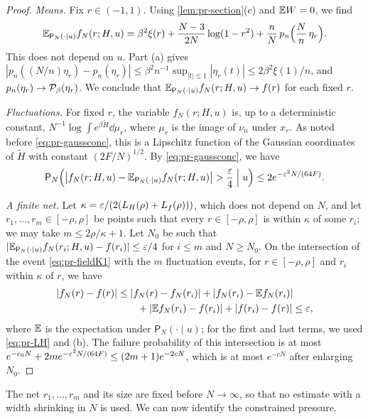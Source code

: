 \begin{proof}
\emph{Means.} Fix $r\in(-1,1)$. Using \cref{lem:pr-section}(c) and $\mathbb E W=0$, we find
\[
\mathbb E_{\mathsf P_N(\cdot\mid u)}f_N(r;H,u)=\beta^2\xi(r)+\frac{N-3}{2N}\log(1-r^2)+\frac nN\,p_n\Bigl(\frac Nn\,\eta_r\Bigr).
\]
This does not depend on $u$. Part (a) gives $|p_n((N/n)\eta_r)-p_n(\eta_r)|\le\beta^2n^{-1}\sup_{|t|\le1}|\eta_r(t)|\le 2\beta^2\xi(1)/n$, and $p_n(\eta_r)\to\mathcal P_\beta(\eta_r)$. We conclude that $\mathbb E_{\mathsf P_N(\cdot\mid u)}f_N(r;H,u)\to f(r)$ for each fixed $r$.

\emph{Fluctuations.} For fixed $r$, the variable $f_N(r;H,u)$ is, up to a deterministic constant, $N^{-1}\log\int e^{\beta\widetilde H}\dd\mu_r$, where $\mu_r$ is the image of $\nu_n$ under $x_r$. As noted before \eqref{eq:pr-gaussconc}, this is a Lipschitz function of the Gaussian coordinates of $\widetilde H$ with constant $(2F/N)^{1/2}$. By \eqref{eq:pr-gaussconc}, we have
\[
\mathsf P_N\Bigl(\bigl|f_N(r;H,u)-\E_{\mathsf P_N(\cdot\mid u)}f_N(r;H,u)\bigr|>\frac\eps4\Bigm| u\Bigr)\le 2e^{-\eps^2N/(64F)} .
\]

\emph{A finite net.} Let $\kappa=\varepsilon/(2(L_H(\rho)+L_f(\rho)))$, which does not depend on $N$, and let $r_1,\dots,r_m\in[-\rho,\rho]$ be points such that every $r\in[-\rho,\rho]$ is within $\kappa$ of some $r_i$; we may take $m\le 2\rho/\kappa+1$. Let $N_0$ be such that $|\mathbb E_{\mathsf P_N(\cdot\mid u)}f_N(r_i;H,u)-f(r_i)|\le\varepsilon/4$ for $i\le m$ and $N\ge N_0$. On the intersection of the event \eqref{eq:pr-fieldK1} with the $m$ fluctuation events, for $r\in[-\rho,\rho]$ and $r_i$ within $\kappa$ of $r$, we have
\begin{align*}
|f_N(r)-f(r)|&\le|f_N(r)-f_N(r_i)|+|f_N(r_i)-\mathbb E f_N(r_i)|\\
&\qquad+|\mathbb E f_N(r_i)-f(r_i)|+|f(r_i)-f(r)|\le\varepsilon,
\end{align*}
where $\mathbb E$ is the expectation under $\mathsf P_N(\cdot\mid u)$; for the first and last terms, we used \eqref{eq:pr-LH} and (b). The failure probability of this intersection is at most $e^{-c_0N}+2me^{-\varepsilon^2N/(64F)}\le(2m+1)e^{-2cN}$, which is at most $e^{-cN}$ after enlarging $N_0$.
\end{proof}

The net $r_1,\dots,r_m$ and its size are fixed before $N\to\infty$, so that no estimate with a width shrinking in $N$ is used. We can now identify the constrained pressure.


